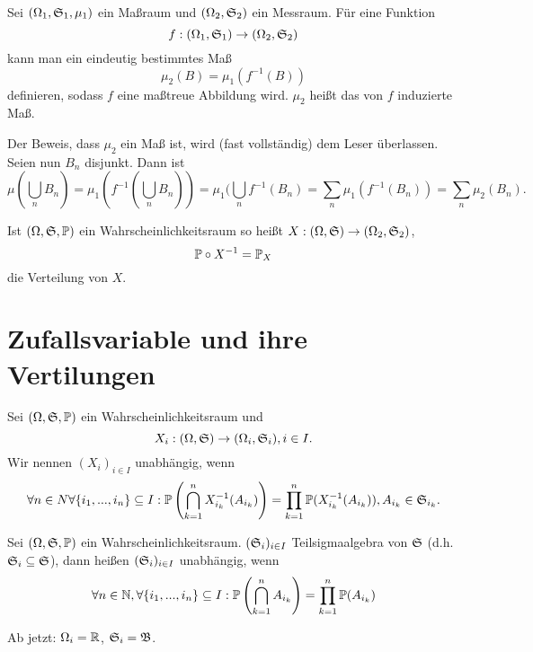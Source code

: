 			\begin{satz}
				Sei $(\Omega_1,\mf{S}_1,\mu_1)$ ein Maßraum und $(\Omega_2,\mf{S}_2)$ ein Messraum. Für eine Funktion
				\[ f:(\Omega_1,\mf{S}_1)\to (\Omega_2,\mf{S}_2) \]
				kann man ein eindeutig bestimmtes Maß
				\[ \mu_2(B)=\mu_1(f^{-1}(B)) \]
				definieren, sodass $f$ eine maßtreue Abbildung wird. $\mu_2$ heißt das von $f$ induzierte Maß. 
			\end{satz}
			
			\begin{bew}
				Der Beweis, dass $\mu_2$ ein Maß ist, wird (fast vollständig) dem Leser überlassen. Seien nun $B_n$ disjunkt. Dann ist
				\[ \mu(\bigcup_n B_n)=\mu_1(f^{-1}(\bigcup_n B_n))=\mu_1(\bigcup_n f^{-1}(B_n)=\sum_n \mu_1(f^{-1}(B_n))=\sum_n\mu_2(B_n). \]
			\end{bew}
			
			\begin{bem}
				Ist $(\Omega,\mf{S}, \P)$ ein Wahrscheinlichkeitsraum so heißt $X:(\Omega,\mf{S})\to(\Omega_2,\mf{S}_2)$,
				\[ \P\circ X^{-1}=\P_X \]
				die Verteilung von $X$. 
			\end{bem}
			
		\section{Zufallsvariable und ihre Vertilungen}
			\begin{defi}
				Sei $(\Omega,\mf{S},\P)$ ein Wahrscheinlichkeitsraum und 
				\[ X_i: (\Omega,\mf{S})\to (\Omega_i, \mf{S}_i), i\in I. \]
				Wir nennen $(X_i)_{i\in I}$ unabhängig, wenn 
				\[ \forall n\in N\forall \{i_1,...,i_n\}\subseteq I: \P\left(\bigcap_{k=1}^n X_{i_k}^{-1}(A_{i_k})\right)=\prod_{k=1}^n\P(X_{i_k}^{-1}(A_{i_k})), A_{i_k}\in\mf{S}_{i_k}. \]
			\end{defi}
			
			\begin{bem}
				Sei $(\Omega, \mf{S}, \P)$ ein Wahrscheinlichkeitsraum. $(\mf{S}_i)_{i\in I}$ Teilsigmaalgebra von $\mf{S}$ (d.h. $\mf{S}_i\subseteq\mf{S}$), dann heißen $(\mf{S}_i)_{i\in I}$ unabhängig, wenn 
				\[ \forall n\in \N,\forall \{i_1,...,i_n\}\subseteq I:\P\left(\bigcap_{k=1}^n A_{i_k}\right)=\prod_{k=1}^{n}\P(A_{i_k}) \]
			\end{bem}
			
			\begin{bem}
				Ab jetzt: $\Omega_i=\R$, $\mf{S}_i=\mf{B}$. 
			\end{bem}
			
